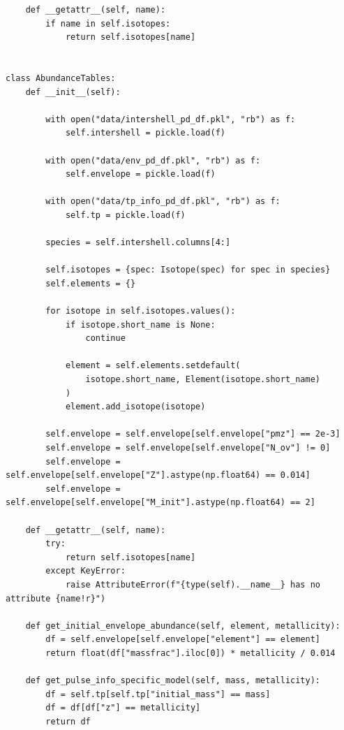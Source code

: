 \documentclass[a4paper,10pt]{article}
\begin{document}
\begin{verbatim}
    def __getattr__(self, name):
        if name in self.isotopes:
            return self.isotopes[name]


class AbundanceTables:
    def __init__(self):

        with open("data/intershell_pd_df.pkl", "rb") as f:
            self.intershell = pickle.load(f)

        with open("data/env_pd_df.pkl", "rb") as f:
            self.envelope = pickle.load(f)

        with open("data/tp_info_pd_df.pkl", "rb") as f:
            self.tp = pickle.load(f)

        species = self.intershell.columns[4:]

        self.isotopes = {spec: Isotope(spec) for spec in species}
        self.elements = {}

        for isotope in self.isotopes.values():
            if isotope.short_name is None:
                continue

            element = self.elements.setdefault(
                isotope.short_name, Element(isotope.short_name)
            )
            element.add_isotope(isotope)

        self.envelope = self.envelope[self.envelope["pmz"] == 2e-3]
        self.envelope = self.envelope[self.envelope["N_ov"] != 0]
        self.envelope = self.envelope[self.envelope["Z"].astype(np.float64) == 0.014]
        self.envelope = self.envelope[self.envelope["M_init"].astype(np.float64) == 2]

    def __getattr__(self, name):
        try:
            return self.isotopes[name]
        except KeyError:
            raise AttributeError(f"{type(self).__name__} has no attribute {name!r}")

    def get_initial_envelope_abundance(self, element, metallicity):
        df = self.envelope[self.envelope["element"] == element]
        return float(df["massfrac"].iloc[0]) * metallicity / 0.014

    def get_pulse_info_specific_model(self, mass, metallicity):
        df = self.tp[self.tp["initial_mass"] == mass]
        df = df[df["z"] == metallicity]
        return df

\end{verbatim}
\nextpage
\end{document}
